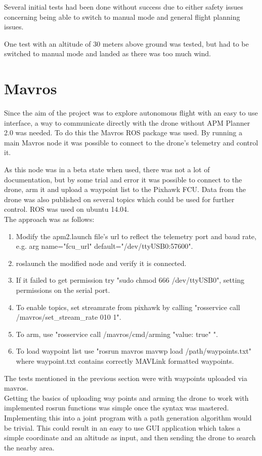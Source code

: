 Several initial tests had been done without success due to either safety issues concerning being
able to switch to manual mode and general flight planning issues.

One test with an altitude of 30 meters above ground was tested, but had to be switched to manual
mode and landed as there was too much wind.
 
\section{Mavros}
\label{sec:mavros}
Since the aim of the project was to explore autonomous flight with an easy to use interface, a way
to communicate directly with the drone without APM Planner 2.0 was needed. To do this the Mavros
\cite{Ref:Mavros} ROS package was used. By running a main Mavros node it was possible to connect to
the drone's telemetry and control it.

As this node was in a beta state when used, there was not a lot of documentation, but by some trial
and error it was possible to connect to the drone, arm it and upload a waypoint list to the
Pixhawk FCU. Data from the drone was also published on several topics which could be used for further
control. ROS was used on ubuntu 14.04.\\
The approach was as follows:
\begin{enumerate}
\item Modify the apm2.launch file's url to reflect the telemetry port and baud rate, e.g. arg
name="fcu\_url" default="/dev/ttyUSB0:57600".
\item roslaunch the modified node and verify it is connected.
\item If it failed to get permission try "sudo chmod 666 /dev/ttyUSB0", setting permissions on the serial port.
\item To enable topics, set streamrate from pixhawk by calling "rosservice call /mavros/set\_stream\_rate
010 1".
\item To arm, use "rosservice call /mavros/cmd/arming "value: true" ".
\item To load waypoint list use "rosrun mavros mavwp load /path/waypoints.txt" where
waypoint.txt contains correctly MAVLink formatted waypoints.
\end{enumerate}

The tests mentioned in the previous section were with waypoints uploaded via mavros.\\%
Getting the basics of uploading way points and arming the drone to work with implemented rosrun
functions was simple once the syntax was mastered.
Implementing this into a joint program with a
path generation algorithm would be trivial.
This could result in an easy to use GUI application
which takes a simple coordinate and an altitude as input,
and then sending the drone to search the nearby area.

